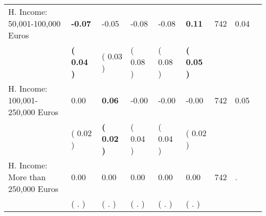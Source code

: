 \begin{tabular}{L{6.2cm} C{1.8cm} C{1.8cm} C{1.8cm} C{1.8cm} C{1.8cm} C{1.8cm} C{0.3cm} C{0.3cm}}
H. Income: 50,001-100,000 Euros & \textbf{    -0.07} &     -0.05 &     -0.08 &     -0.08 & \textbf{     0.11}  & 742 &       0.04 \\ 
 & \textbf{(     0.04 )} & (     0.03 ) & (     0.08 ) & (     0.08 ) & \textbf{(     0.05 )}  & \\
H. Income: 100,001-250,000 Euros &      0.00 & \textbf{     0.06} &     -0.00 &     -0.00 &     -0.00  & 742 &       0.05 \\ 
 & (     0.02 ) & \textbf{(     0.02 )} & (     0.04 ) & (     0.04 ) & (     0.02 )  & \\
H. Income: More than 250,000 Euros &      0.00 &      0.00 &      0.00 &      0.00 &      0.00  & 742 &          . \\ 
 & (        . ) & (        . ) & (        . ) & (        . ) & (        . )  & \\
\bottomrule
\end{tabular}

